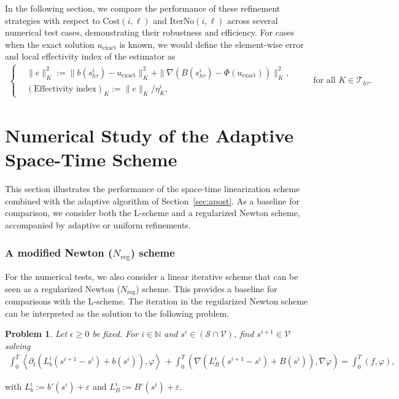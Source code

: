 \documentclass[review,11pt]{article}
\numberwithin{equation}{section}
\def \N  {{\mathbb{N}}}
\def \htt {{h\tau}}
\def \calV {\mathcal{V}}
\def \calS {\mathcal{S}}
\def \calT {\mathcal{T}}
\newtheorem{problem}{Problem}
\begin{document}
\noindent
In the following section, we compare the performance of these refinement strategies with respect to $\mathrm{Cost}(i,\ell)$ and $\mathrm{IterNo}(i,\ell)$ across several numerical test cases, demonstrating their robustness and efficiency. For cases when the exact solution $u_{\mathrm{exact}}$ is known, we would define the element-wise error and local effectivity index of the estimator as
\begin{align}\left\{\begin{aligned}
        &\|e\|_K^2:= \|b(s^i_\htt)-u_{\mathrm{exact}}\|_K^2 + \|\nabla (B(s^i_\htt)-\Phi(u_{\mathrm{exact}}))\|_K^2, \\
    &(\text{Effectivity index})_K:= \|e\|_K/\eta_K^i,
\end{aligned}
\right. \qquad \text{ for all } K\in \calT_\htt.\label{eq:effectivity}
\end{align}

\section{Numerical Study of the Adaptive Space-Time Scheme}\label{sec:Numerical_results}

This section illustrates the performance of the space-time linearization scheme combined with the adaptive algorithm of Section~\ref{sec:apost}. As a baseline for comparison, we consider both the L-scheme and a regularized Newton scheme, accompanied by adaptive or uniform refinements.

\subsubsection{A modified Newton ($N_{\mathrm{reg}}$) scheme}
For the numerical tests, we also consider a linear iterative scheme that can be seen as a regularized Newton ($N_{\mathrm{reg}}$) scheme. This provides a baseline for comparisons with the L-scheme. The iteration in the regularized Newton scheme can be interpreted as the solution to the following problem.
\begin{problem}
Let $\epsilon\geq0$ be fixed. For $i\in \N$ and $s^i\in (\calS\cap \calV)$, find $s^{i+1}\in \calV$ solving
\begin{align}\label{eq:M-scheme}
\int_0^T \!\left\langle \partial_t \left( L^i_b(s^{i+1} - s^i) + b(s^i) \right), \varphi \right\rangle \,  
+ \int_0^T \!\left( \nabla \left( L^i_B(s^{i+1} - s^i) + B(s^i) \right), \nabla \varphi \right) 
= \int_0^T \!( f, \varphi ),
\end{align}
\end{problem}
with $L^i_b:= b'(s^i) + \varepsilon$ and $L^i_B:=B'(s^i) +\varepsilon$.
\end{document}
